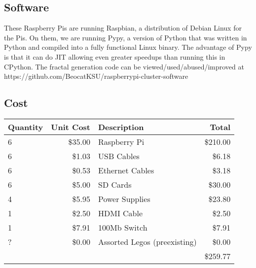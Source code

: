 \documentclass[a4paper,10pt]{article}
\begin{document}
\subsection{Software}
These Raspberry Pis are running Raspbian, a distribution of Debian Linux for the Pis.
On them, we are running Pypy, a version of Python that was written in Python and compiled into a fully functional Linux binary.
The advantage of Pypy is that it can do JIT allowing even greater speedups than running this in CPython.
The fractal generation code can be viewed/used/abused/improved at https://github.com/BeocatKSU/raspberrypi-cluster-software

\subsection{Cost}
\begin{tabular}{|l|r|l|r|}
\hline
\textbf{Quantity}&\textbf{Unit Cost}&\textbf{Description}&\textbf{Total}\\
\hline
6&\$35.00&Raspberry Pi&\$210.00\\
6&\$1.03&USB Cables&\$6.18\\
6&\$0.53&Ethernet Cables&\$3.18\\
6&\$5.00&SD Cards&\$30.00\\
4&\$5.95&Power Supplies&\$23.80\\
1&\$2.50&HDMI Cable&\$2.50\\
1&\$7.91&100Mb Switch&\$7.91\\
?&\$0.00&Assorted Legos (preexisting)&\$0.00\\
\hline
&&&\$259.77\\
\hline
\end{tabular}
\end{document}
